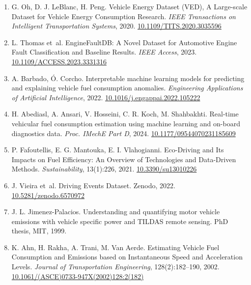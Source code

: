 \begin{enumerate}

\item
  \label{r1}{G. Oh, D. J. LeBlanc, H. Peng. Vehicle
  Energy Dataset (VED), A Large-scale Dataset for Vehicle Energy
  Consumption Research. \emph{IEEE Transactions on Intelligent
  Transportation Systems}, 2020.
  \href{https://doi.org/10.1109/TITS.2020.3035596}{10.1109/TITS.2020.3035596}}
\item
  \label{r2}{L. Thomas et~al. EngineFaultDB: A Novel
  Dataset for Automotive Engine Fault Classification and Baseline
  Results. \emph{IEEE Access}, 2023.
  \href{https://doi.org/10.1109/ACCESS.2023.3331316}{10.1109/ACCESS.2023.3331316}}
\item
  \label{r3}{A. Barbado, Ó. Corcho. Interpretable machine
  learning models for predicting and explaining vehicle fuel consumption
  anomalies. \emph{Engineering Applications of Artificial Intelligence},
  2022.
  \href{https://doi.org/10.1016/j.engappai.2022.105222}{10.1016/j.engappai.2022.105222}}
\item
  \label{r4}{H. Abediasl, A. Ansari, V. Hosseini, C. R.
  Koch, M. Shahbakhti. Real-time vehicular fuel consumption estimation
  using machine learning and on-board diagnostics data. \emph{Proc.
  IMechE Part D}, 2024.
  \href{https://doi.org/10.1177/09544070231185609}{10.1177/09544070231185609}}
\item
  \label{r5}{P. Fafoutellis, E. G. Mantouka, E. I.
  Vlahogianni. Eco-Driving and Its Impacts on Fuel Efficiency: An
  Overview of Technologies and Data-Driven Methods.
  \emph{Sustainability}, 13(1):226, 2021.
  \href{https://doi.org/10.3390/su13010226}{10.3390/su13010226}}
\item
  \label{r6}{J. Vieira et~al. Driving Events Dataset.
  Zenodo, 2022.
  \href{https://doi.org/10.5281/zenodo.6570972}{10.5281/zenodo.6570972}}
\item
  \label{r7}{J. L. Jimenez-Palacios. Understanding and
  quantifying motor vehicle emissions with vehicle specific power and
  TILDAS remote sensing. PhD thesis, MIT, 1999.}
\item
  \label{r8}{K. Ahn, H. Rakha, A. Trani, M. Van Aerde.
  Estimating Vehicle Fuel Consumption and Emissions based on
  Instantaneous Speed and Acceleration Levels. \emph{Journal of
  Transportation Engineering}, 128(2):182--190, 2002.
  \href{https://doi.org/10.1061/(ASCE)0733-947X(2002)128:2(182)}{10.1061/(ASCE)0733-947X(2002)128:2(182)}}

\end{enumerate}
